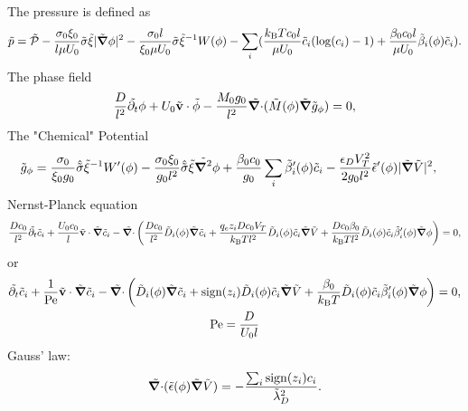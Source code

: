 \documentclass[a4paper,10pt]{article}
\renewcommand{\v}[1]{\mathbf{#1}}
\renewcommand{\v}[1]{\ensuremath{\mathbf{#1}}} %
\newcommand{\ti}[1]{\ensuremath{\tilde{#1}}} %
\newcommand{\gv}[1]{\ensuremath{\mbox{\boldmath$ #1 $}}}
\newcommand{\grad}[1]{\gv{\nabla} #1} %
\renewcommand{\div}[1]{\gv{\nabla} \cdot #1} %
\newcommand{\laplacian}[1]{\grad^2 #1}
\newcommand{\pdt}[1]{\partial_t #1}
\begin{document}
The pressure is defined as 
\begin{equation}
\ti{p} = \ti{\mathcal{P}} -   \frac{\sigma_0 \xi_0}{l \mu U_0} \ti{\sigma}\ti{\xi}|\ti{\grad{}} \phi|^2 - \frac{\sigma_0 l}{\xi_0 \mu U_0}\ti{\sigma}\ti{\xi}^{-1} W(\phi)  - \sum_i ( \frac{k_{\mathrm{B}} T c_0 l}{\mu U_0} \ti{c}_i(\log(c_i) -1) + \frac{\beta_0 c_0 l}{\mu U_0}\ti{\beta}_i(\phi) \ti{c}_i ) .
\end{equation}
The phase field
\begin{gather}
\frac{D}{l^2}\ti{\pdt{}} \phi + U_0\ti{\v v} \cdot \ti{\phi} - \frac{M_0 g_0 }{l^2}\ti{\div{}} (\ti{M}(\phi) \ti{\grad{}} \ti{g}_\phi ) = 0,
\end{gather}
The "Chemical" Potential
\begin{align}
\tilde{g}_\phi &= \frac{\sigma_0}{\xi_0 g_0 }\hat{\ti{\sigma}}\ti{\xi}^{-1}W'(\phi) - \frac{\sigma_0 \xi_0}{g_0 l^2}\hat{\ti{\sigma}}\ti{\xi}\ti{\laplacian{}}\phi + \frac{\beta_0 c_0}{g_0}\sum_i \ti{\beta}_i'(\phi) \ti{c}_i - \frac{\epsilon_D V_T^2}{2 g_0 l^2} \ti{\epsilon}'(\phi) | \ti{\grad{}} \ti{V} |^2 ,
\end{align}
Nernst-Planck equation 
\begin{gather}
\frac{D c_0}{l^2}\ti{\pdt{}} \ti{c}_i + \frac{U_0 c_0}{l}\ti{\v{v}} \cdot \ti{\grad{}} \ti{c}_i - \ti{\div{}} \left( \frac{D c_0}{l^2}\ti{D}_{i} (\phi) \ti{\grad{}} \ti{c}_i + \frac{ q_e  z_i D c_0 V_T}{k_{\rm B} T l^2}\ti{D}_i(\phi)\ti{c}_i \ti{\grad{}} \ti{V} +\frac{D c_0 \beta_0}{k_{\rm B} T l^2}\ti{D}_i(\phi)\ti{c}_i\ti{\beta}_i'(\phi) \ti{\grad{}} \phi \right) = 0, 
\end{gather}
or 
\begin{gather}
\ti{\pdt{}} \ti{c}_i + \frac{1}{\mathrm{Pe}}\ti{\v{v}} \cdot \ti{\grad{}} \ti{c}_i - \ti{\div{}} \left( \ti{D}_{i} (\phi) \ti{\grad{}} \ti{c}_i + \mathrm{sign}(z_i)\ti{D}_i(\phi)\ti{c}_i \ti{\grad{}} \ti{V} +\frac{ \beta_0}{k_{\rm B} T }\ti{D}_i(\phi)\ti{c}_i\ti{\beta}_i'(\phi) \ti{\grad{}} \phi \right) = 0,\\ 
\mathrm{Pe} = \frac{D}{U_0 l }
\end{gather}
Gauss' law: 
\begin{gather}
\ti{\div{}} ( \ti{\epsilon} (\phi) \ti{\grad{}} \ti{V} ) = - \frac{\sum_i \mathrm{sign}(z_i) c_i}{\ti{\lambda}_D^2}.
\end{gather}
\newpage
\end{document}
